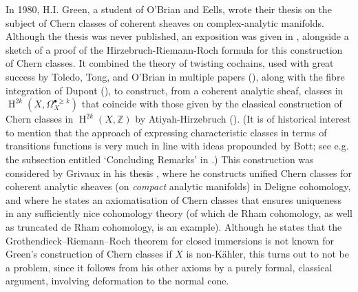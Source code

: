 \documentclass[11pt,fleqn]{article}
\theoremstyle{plain}
\theoremstyle{definition}
\theoremstyle{remark}
\numberwithin{equation}{theorem}
\DeclareMathOperator{\HH}{H}
\begin{document}
    In 1980, H.I. Green, a student of O'Brian and Eells, wrote their thesis \cite{Green1980} on the subject of Chern classes of coherent sheaves on complex-analytic manifolds.
    Although the thesis was never published, an exposition was given in \cite{Toledo&Tong1986}, alongside a sketch of a proof of the Hirzebruch-Riemann-Roch formula for this construction of Chern classes.
    It combined the theory of {twisting cochains}, used with great success by Toledo, Tong, and O'Brian in multiple papers (\cite{Toledo&Tong1976,Toledo&Tong1978,OBrian&etal1981,OBrian&etal1985}), along with the {fibre integration} of Dupont (\cite{Dupont1976}), to construct, from a coherent analytic sheaf, classes in $\HH^{2k}(X,\Omega_X^{\bullet\geqslant k})$ that coincide with those given by the classical construction of Chern classes in $\HH^{2k}(X,\mathbb{Z})$ by Atiyah-Hirzebruch (\cite{Atiyah&Hirzebruch1962}).
    (It is of historical interest to mention that the approach of expressing characteristic classes in terms of transitions functions is very much in line with ideas propounded by Bott; see e.g. the subsection entitled `Concluding Remarks' in \cite[§23]{Bott&Tu1982}.)
    This construction was considered by Grivaux in his thesis \cite{Grivaux2009}, where he constructs unified Chern classes for coherent analytic sheaves (on \emph{compact} analytic manifolds) in Deligne cohomology, and where he states an axiomatisation of Chern classes that ensures uniqueness in any sufficiently nice cohomology theory (of which de Rham cohomology, as well as truncated de Rham cohomology, is an example).
    Although he states that the Grothendieck--Riemann--Roch theorem for closed immersions is not known for Green's construction of Chern classes if $X$ is non-Kähler, this turns out to not be a problem, since it follows from his other axioms by a purely formal, classical argument, involving deformation to the normal cone.
\end{document}
